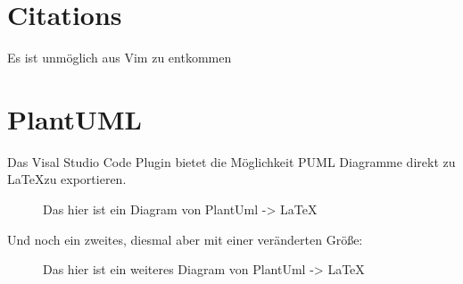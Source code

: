 \section{Citations}
Es ist unmöglich aus Vim zu entkommen \cite{nerd_how_2012}

\section{PlantUML}
Das Visal Studio Code Plugin bietet die Möglichkeit PUML Diagramme direkt zu \LaTeX zu exportieren.

\begin{figure}[H]
    \centering
    
    \caption{Das hier ist ein Diagram von PlantUml -> \LaTeX}
\end{figure}

Und noch ein zweites, diesmal aber mit einer veränderten Größe:
\begin{figure}[H]
    \centering
    \resizebox{10cm}{!}{
        
    }
    \caption{Das hier ist ein weiteres Diagram von PlantUml -> \LaTeX}
\end{figure}
